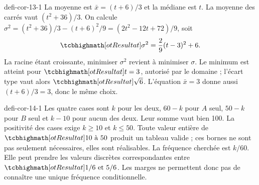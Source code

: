 \begin{blocEdition}{defi-cor-13-1}
La moyenne est $\bar x=(t+6)/3$ et la médiane est $t$. La moyenne des carrés vaut $(t^2+36)/3$.
On calcule $\sigma^2=(t^2+36)/3-(t+6)^2/9=(2t^2-12t+72)/9$, soit
\[\res{\sigma^2=\frac29(t-3)^2+6}.\]
La racine étant croissante, minimiser $\sigma^2$ revient à minimiser $\sigma$.
Le minimum est atteint pour $\res{t=3}$, autorisé par le domaine ; l’écart type vaut alors $\res{\sqrt6}$. L’équation $\bar x=3$ donne aussi $(t+6)/3=3$, donc le même choix.
\end{blocEdition}
\begin{blocEdition}{defi-cor-14-1}
Les quatre cases sont $k$ pour les deux, $60-k$ pour $A$ seul, $50-k$ pour $B$ seul et $k-10$ pour aucun des deux. Leur somme vaut bien 100.
La positivité des cases exige $k\ge10$ et $k\le50$. Toute valeur entière de $\res{10\text{ à }50}$ produit un tableau valide ; ces bornes ne sont pas seulement nécessaires, elles sont réalisables.
La fréquence cherchée est $k/60$. Elle peut prendre les valeurs discrètes correspondantes entre $\res{1/6\text{ et }5/6}$. Les marges ne permettent donc pas de connaître une unique fréquence conditionnelle.
\end{blocEdition}
